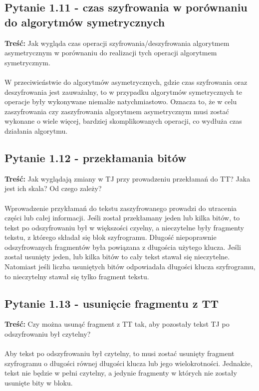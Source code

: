 \documentclass{article}
\begin{document}
\subsection{Pytanie 1.11 - czas szyfrowania w porównaniu do algorytmów symetrycznych}
\textbf{Treść: } Jak wygląda czas operacji szyfrowania/deszyfrowania algorytmem asymetrycznym w porównaniu do realizacji tych operacji algorytmem symetrycznym. \\\\
W przeciwieństwie do algorytmów asymetrycznych, gdzie czas szyfrowania oraz deszyfrowania jest zauważalny, to w przypadku algorytmów symetrycznych te operacje były wykonywane niemalże natychmiastowo.
Oznacza to, że w celu zaszyfrowania czy zaszyfrowania algorytmem asymetrycznym musi zostać wykonane o wiele więcej, bardziej skomplikowanych operacji, co wydłuża czas działania algorytmu.
\subsection{Pytanie 1.12 - przekłamania bitów}
\textbf{Treść: } Jak wyglądają zmiany w TJ przy prowadzeniu przekłamań do TT? Jaka jest ich skala? Od czego zależy? \\\\
Wprowadzenie przykłamań do tekstu zaszyfrowanego prowadzi do utracenia części lub całej informacji. Jeśli został przekłamany jeden lub kilka bitów, to tekst po odszyfrowaniu był w większości czyelny,
a nieczytelne były fragmenty tekstu, z którego składał się blok szyfrogramu. Długość niepoprawnie odszyfrowanych fragmentów była powiązana z długościa użytego klucza. Jeśli został usunięty jeden, lub kilka bitów
to cały tekst stawał się nieczytelne. Natomiast jeśli liczba usuniętych bitów odpowiadała długości klucza szyfrogramu, to nieczytelny stawał się tylko fragment tekstu.
\subsection{Pytanie 1.13 - usunięcie fragmentu z TT}
\textbf{Treść: } Czy można usunąć fragment z TT tak, aby pozostały tekst TJ po odszyfrowaniu był czytelny? \\\\
Aby tekst po odszyfrowaniu był czytelny, to musi zostać usunięty fragment szyfrogramu o długości równej długości klucza lub jego wielokrotności. Jednakże, tekst nie będzie w pełni czytelny,
a jedynie fragmenty w których nie zostały usunięte bity w bloku.
\end{document}
